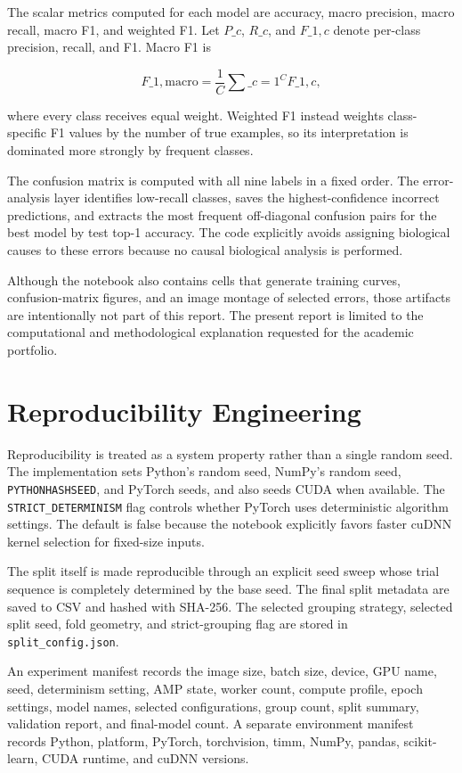 \documentclass[11pt,a4paper]{article}
\begin{document}
The scalar metrics computed for each model are accuracy, macro precision, macro recall, macro F1, and weighted F1. Let $P\_c$, $R\_c$, and $F\_{1,c}$ denote per-class precision, recall, and F1. Macro F1 is

\begin{equation}
F\_{1,\mathrm{macro}} = \frac{1}{C}\sum\_{c=1}^{C}F\_{1,c},
\end{equation}

where every class receives equal weight. Weighted F1 instead weights class-specific F1 values by the number of true examples, so its interpretation is dominated more strongly by frequent classes.

The confusion matrix is computed with all nine labels in a fixed order. The error-analysis layer identifies low-recall classes, saves the highest-confidence incorrect predictions, and extracts the most frequent off-diagonal confusion pairs for the best model by test top-1 accuracy. The code explicitly avoids assigning biological causes to these errors because no causal biological analysis is performed.

Although the notebook also contains cells that generate training curves, confusion-matrix figures, and an image montage of selected errors, those artifacts are intentionally not part of this report. The present report is limited to the computational and methodological explanation requested for the academic portfolio.

\section{Reproducibility Engineering}
Reproducibility is treated as a system property rather than a single random seed. The implementation sets Python's random seed, NumPy's random seed, \texttt{PYTHONHASHSEED}, and PyTorch seeds, and also seeds CUDA when available. The \texttt{STRICT\_DETERMINISM} flag controls whether PyTorch uses deterministic algorithm settings. The default is false because the notebook explicitly favors faster cuDNN kernel selection for fixed-size inputs.

The split itself is made reproducible through an explicit seed sweep whose trial sequence is completely determined by the base seed. The final split metadata are saved to CSV and hashed with SHA-256. The selected grouping strategy, selected split seed, fold geometry, and strict-grouping flag are stored in \texttt{split\_config.json}.

An experiment manifest records the image size, batch size, device, GPU name, seed, determinism setting, AMP state, worker count, compute profile, epoch settings, model names, selected configurations, group count, split summary, validation report, and final-model count. A separate environment manifest records Python, platform, PyTorch, torchvision, timm, NumPy, pandas, scikit-learn, CUDA runtime, and cuDNN versions.
\end{document}
